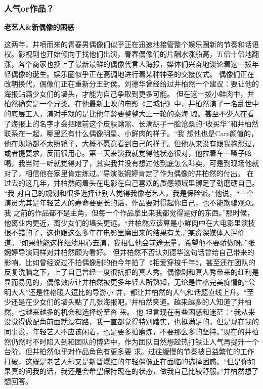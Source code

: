 \documentclass[12pt]{ctexart}
\begin{document}
\subsubsection*{人气or作品？}

\textbf{老艺人\&新偶像的困惑}

这两年，井喷而来的青春男偶像们似乎正在迅速地接管整个娱乐圈新的节奏和话语权。影视剧也开始倾向于找他们出演，青春偶像们的片酬水涨船高，五倍十倍地翻 涨，各个商家也换上了最新最鲜的偶像代言人海报，媒体们兴奋地谈论着这一拨年轻偶像的诞生。娱乐圈似乎正在高调地进行着某种神圣的交接仪式。
偶像们正在改朝换代，偶像们正在重新分王封侯。刘德华曾经给过井柏然一个建议：要让他的海报贴满少女们的墙头，才能为自己争取到更多可能。
但在这一拨小鲜肉中，井柏然确实是一个异类。在他最新上映的电影《三城记》中，井柏然演了一名乱世中的底层工人，演对手戏的是比他年龄要整整大上一轮的秦海 璐。甚至不少人在看了海报上的名字才会把眼前这个皮肤黝黑、长满胡子一脸沧桑的“收买华”和井柏然联系在一起，哪里还有什么偶像明星、小鲜肉的样子。“我 想他也是Care颜值的，他在现场都不太照镜子，大概不愿意看到自己的样子。但他从来没有跟我抱怨过，或者提要求，反而很用心。第一天来演我就觉得他状态很对，他拉着车一嗓子吆喝，我当时一听就觉得对了，其实我并没有想过他到底怎么叫卖，可是到现场他就对了，相信他在家里肯定练过。”导演张婉婷肯定了作为偶像的井柏然的付出。
在过去的这几年，井柏然闷着头在电影在自己喜欢的质感领域里铆足了劲磨砺自己。
“我 对自己的规划和很多选择让别人觉得我像老艺人，我是保险派。”他说，“一个演员尤其是年轻艺人的寿命要更长的话，作品要对得起你自己，也不能欺骗观众。我 之前的作品都不是主角，但每一个作品拿出来我都觉得是好的东西。”那时候，他离业内更近，离少女们的墙头更远。“井柏然应该算是小鲜肉中在大电影里演技很不错的了，这也跟这么多年在电影里磨出来的结果有关。”某资深媒体人评价道。“如果他能这样继续用心去演，我相信他会前途无量，希望他不要骄傲呀。”张婉婷导演同样对井柏然颇为看好。
但井柏然不否认刘德华这句话曾给自己带来的影响，比如曾经说过不拍偶像剧的他今年拍了《相爱穿梭千年》，甚至还在团队的反复洗脑之下，上了自己曾经一度很抗拒的真人秀。偶像剧和真人秀带来的红利是显而易见的，偶像效应让井柏然被更多年轻人所熟知，无论是性格完美痴情的“公明大人”还是性格暖人逗比的导游小 井，都让井柏然的人气和话题直线上升。“至少还是在少女们的墙头贴了几张海报吧。”井柏然笑道。越来越多的人知道了井柏然，也越来越多的机会和选择纷至沓 来。
他 坦言现在有些困惑和迷茫：“我从来没觉得做配角前面就没有路，我一直都觉得特别踏实，也挺满足的。但是现在我的同事说，年轻艺人不应该闲着，也是要多拍磨炼，不要那么多的坚持。”现在的井柏然仍然时不时陷入到和团队的博弈中，作为团队自然想趁热打铁让人气再提升一个台阶，但井柏然似乎对作品角色有更多要 求。过往缓慢的节奏被日益繁忙的工作打破，这既是老艺人却又是新晋爆红的年轻偶像正在面临的选择困惑。“但是你如果真的问我的话，我还是会希望保持现在的状态，做我自己比较舒服。”井柏然想了想回答。
\end{document}
